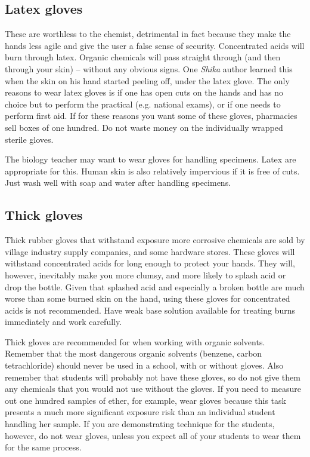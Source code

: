 \subsection{Latex gloves}
These are worthless to the chemist, 
detrimental in fact because they make the hands less agile 
and give the user a false sense of security. 
Concentrated acids will burn through latex. 
Organic chemicals will pass straight through (and then through your skin) -- 
without any obvious signs. 
One \textit{Shika} author learned this when the skin on his hand started peeling off, 
under the latex glove. 
The only reasons to wear latex gloves is if one has open cuts on the hands 
and has no choice but to perform the practical (e.g. 
national exams), 
or if one needs to perform first aid. 
If for these reasons you want some of these gloves, 
pharmacies sell boxes of one hundred. 
Do not waste money on the individually wrapped sterile gloves.

The biology teacher may want to wear gloves for handling specimens. 
Latex are appropriate for this. 
Human skin is also relatively impervious if it is free of cuts. 
Just wash well with soap and water after handling specimens.

\subsection{Thick gloves}
Thick rubber gloves that withstand exposure more corrosive chemicals 
are sold by village industry supply companies, 
and some hardware stores. 
These gloves will withstand concentrated acids 
for long enough to protect your hands. 
They will, 
however, 
inevitably make you more clumsy, 
and more likely to splash acid or drop the bottle. 
Given that splashed acid and especially a broken bottle 
are much worse than some burned skin on the hand, 
using these gloves for concentrated acids is not recommended. 
Have weak base solution available for treating burns immediately 
and work carefully.

Thick gloves are recommended for when working with organic solvents. 
Remember that the most dangerous organic solvents (benzene, 
carbon tetrachloride) should never be used in a school, 
with or without gloves. 
Also remember that students will probably not have these gloves, 
so do not give them any chemicals 
that you would not use without the gloves. 
If you need to measure out one hundred samples of ether, 
for example, 
wear gloves because this task presents 
a much more significant exposure risk 
than an individual student handling her sample. 
If you are demonstrating technique for the students, 
however, 
do not wear gloves, 
unless you expect all of your students to wear them for the same process.

